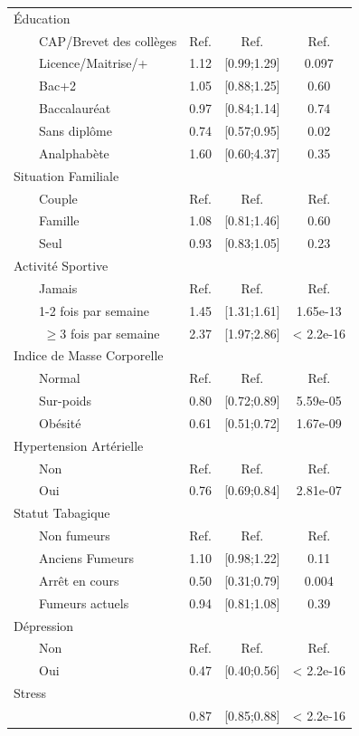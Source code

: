 \documentclass{book}
\begin{document}
\begin{longtable}{lccc}
 
Éducation&&&\\
$\qquad$CAP/Brevet des collèges &Ref.&Ref.&Ref.\\
$\qquad$Licence/Maitrise/+   &1.12 & [0.99;1.29] & 0.097 \\   
$\qquad$Bac+2       &1.05 & [0.88;1.25] & 0.60   \\  
$\qquad$Baccalauréat   &0.97& [0.84;1.14] & 0.74  \\        
$\qquad$Sans diplôme   &0.74 & [0.57;0.95] & 0.02\\
$\qquad$Analphabète &1.60& [0.60;4.37] & 0.35 \\   

         
Situation Familiale&&&\\
$\qquad$Couple&Ref.&Ref.&Ref.\\
$\qquad$Famille&1.08& [0.81;1.46]& 0.60\\    
$\qquad$Seul&0.93 & [0.83;1.05]& 0.23   \\

Activité Sportive&&&\\
$\qquad$Jamais & Ref.&Ref.&Ref.\\
$\qquad$1-2 fois par semaine&1.45& [1.31;1.61]& 1.65e-13\\
$\qquad$ $\geq$3 fois par semaine &2.37 &[1.97;2.86] &< 2.2e-16\\
                  

Indice de Masse Corporelle&&&\\
$\qquad$Normal &Ref.&Ref.&Ref.\\
$\qquad$Sur-poids &0.80 &[0.72;0.89]& 5.59e-05\\ 
$\qquad$Obésité&0.61& [0.51;0.72]& 1.67e-09\\ 

Hypertension Artérielle&&&\\
$\qquad$Non& Ref.&Ref.&Ref.\\
$\qquad$Oui &0.76 &[0.69;0.84]& 2.81e-07\\ 

Statut Tabagique&&&\\
$\qquad$Non fumeurs &Ref.&Ref.&Ref.\\
$\qquad$Anciens Fumeurs &1.10& [0.98;1.22]& 0.11\\    
$\qquad$Arrêt en cours &0.50 &[0.31;0.79]& 0.004\\ 
$\qquad$Fumeurs actuels &0.94& [0.81;1.08]& 0.39\\

Dépression&&&\\
$\qquad$Non&Ref.&Ref.&Ref.\\
$\qquad$Oui & 0.47 &[0.40;0.56]& < 2.2e-16\\
Stress &&&\\
&0.87& [0.85;0.88]& < 2.2e-16\\ 
\hline
\end{longtable}
\end{document}
